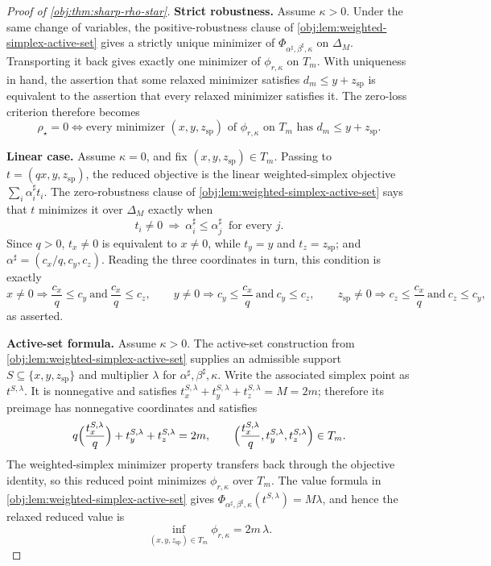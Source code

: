 \begin{proof}[Proof of \cref{obj:thm:sharp-rho-star}]
\textbf{Strict robustness.}
Assume \(\kappa>0\).  Under the same change of variables, the positive-robustness clause of \cref{obj:lem:weighted-simplex-active-set} gives a strictly unique minimizer of \(\Phi_{\alpha^\sharp,\beta^\sharp,\kappa}\) on \(\Delta_M\).  Transporting it back gives exactly one minimizer of \(\phi_{r,\kappa}\) on \(T_m\). %
With uniqueness in hand, the assertion that some relaxed minimizer satisfies \(d_m\le y+z_{\mathrm{sp}}\) is equivalent to the assertion that every relaxed minimizer satisfies it.  The zero-loss criterion therefore becomes
\[
\rho_\star=0
\iff
\text{every minimizer }(x,y,z_{\mathrm{sp}})\text{ of }\phi_{r,\kappa}\text{ on }T_m\text{ has }d_m\le y+z_{\mathrm{sp}} .
\]

\textbf{Linear case.}
Assume \(\kappa=0\), and fix \((x,y,z_{\mathrm{sp}})\in T_m\).  Passing to \(t=(qx,y,z_{\mathrm{sp}})\), the reduced objective is the linear weighted-simplex objective \(\sum_i\alpha^\sharp_i t_i\).  The zero-robustness clause of \cref{obj:lem:weighted-simplex-active-set} says that \(t\) minimizes it over \(\Delta_M\) exactly when
\[
t_i\ne0\ \Longrightarrow\ \alpha^\sharp_i\le\alpha^\sharp_j\ \text{ for every }j .
\]
Since \(q>0\), \(t_x\ne0\) is equivalent to \(x\ne0\), while \(t_y=y\) and \(t_z=z_{\mathrm{sp}}\); and \(\alpha^\sharp=(c_x/q,c_y,c_z)\).  Reading the three coordinates in turn, this condition is exactly
\[
x\ne0\Rightarrow\frac{c_x}{q}\le c_y\ \text{and}\ \frac{c_x}{q}\le c_z,
\qquad
y\ne0\Rightarrow c_y\le\frac{c_x}{q}\ \text{and}\ c_y\le c_z,
\qquad
z_{\mathrm{sp}}\ne0\Rightarrow c_z\le\frac{c_x}{q}\ \text{and}\ c_z\le c_y,
\]
as asserted. %

\textbf{Active-set formula.}
Assume \(\kappa>0\).  The active-set construction from \cref{obj:lem:weighted-simplex-active-set} supplies an admissible support \(S\subseteq\{x,y,z_{\mathrm{sp}}\}\) and multiplier \(\lambda\) for \(\alpha^\sharp,\beta^\sharp,\kappa\).  Write the associated simplex point as \(t^{S,\lambda}\).  It is nonnegative and satisfies \(t^{S,\lambda}_x+t^{S,\lambda}_y+t^{S,\lambda}_z=M=2m\); therefore its preimage has nonnegative coordinates and satisfies
\[
q\Bigl(\frac{t_x^{S,\lambda}}{q}\Bigr)+t_y^{S,\lambda}+t_z^{S,\lambda}=2m,
\qquad
\Bigl(\frac{t_x^{S,\lambda}}{q},t_y^{S,\lambda},t_z^{S,\lambda}\Bigr)\in T_m .
\]
The weighted-simplex minimizer property transfers back through the objective identity, so this reduced point minimizes \(\phi_{r,\kappa}\) over \(T_m\).  The value formula in \cref{obj:lem:weighted-simplex-active-set} gives \(\Phi_{\alpha^\sharp,\beta^\sharp,\kappa}(t^{S,\lambda})=M\lambda\), and hence the relaxed reduced value is
\[
\inf_{(x,y,z_{\mathrm{sp}})\in T_m}\phi_{r,\kappa}=2m\,\lambda .
\]


\end{proof}
